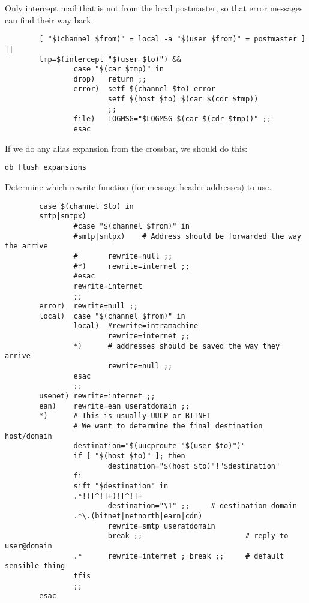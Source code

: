 Only intercept mail that is not from the local postmaster,
so that error messages can find their way back.

\begin{tscreen}
\begin{verbatim}
        [ "$(channel $from)" = local -a "$(user $from)" = postmaster ] ||
        tmp=$(intercept "$(user $to)") &&
                case "$(car $tmp)" in
                drop)   return ;;
                error)  setf $(channel $to) error
                        setf $(host $to) $(car $(cdr $tmp))
                        ;;
                file)   LOGMSG="$LOGMSG $(car $(cdr $tmp))" ;;
                esac
\end{verbatim}
\end{tscreen}

If we do any alias expansion from the crossbar, we should do this:
\begin{tscreen}
\begin{verbatim}
db flush expansions
\end{verbatim}
\end{tscreen}

Determine which rewrite function (for message header addresses) to use.
\begin{tscreen}
\begin{verbatim}
        case $(channel $to) in
        smtp|smtpx)
                #case "$(channel $from)" in
                #smtp|smtpx)    # Address should be forwarded the way the arrive
                #       rewrite=null ;;
                #*)     rewrite=internet ;;
                #esac
                rewrite=internet
                ;;
        error)  rewrite=null ;;
        local)  case "$(channel $from)" in
                local)  #rewrite=intramachine
                        rewrite=internet ;;
                *)      # addresses should be saved the way they arrive
                        rewrite=null ;;
                esac
                ;;
        usenet) rewrite=internet ;;
        ean)    rewrite=ean_useratdomain ;;
        *)      # This is usually UUCP or BITNET
                # We want to determine the final destination host/domain
                destination="$(uucproute "$(user $to)")"
                if [ "$(host $to)" ]; then
                        destination="$(host $to)"!"$destination"
                fi
                sift "$destination" in
                .*!([^!]+)![^!]+
                        destination="\1" ;;     # destination domain
                .*\.(bitnet|netnorth|earn|cdn)
                        rewrite=smtp_useratdomain
                        break ;;                        # reply to user@domain
                .*      rewrite=internet ; break ;;     # default sensible thing
                tfis
                ;;
        esac
\end{verbatim}
\end{tscreen}

